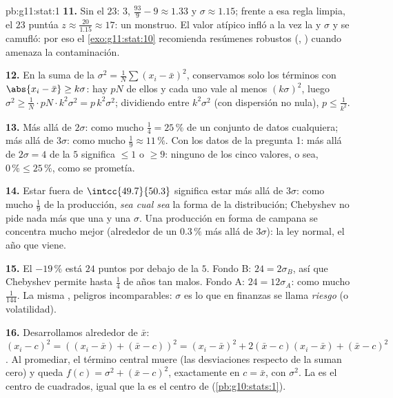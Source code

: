 \begin{solution}{pb:g11:stat:1}
\textbf{11.} Sin el $23$:  $3$, 
$\frac{93}{9} - 9 \approx 1.33$ y $\sigma \approx 1.15$; frente a esa
regla limpia, el $23$ puntúa $z \approx \frac{20}{1.15} \approx 17$: un
monstruo. El valor atípico infló a la vez la  y $\sigma$ y se
camufló: por eso el \cref{exo:g11:stat:10} recomienda resúmenes robustos
(, ) cuando amenaza la contaminación.

\textbf{12.} En la suma de la 
$\sigma^2 = \frac1N \sum (x_i - \bar x)^2$, conservamos solo los términos
con $\abs{x_i - \bar x} \geq k\sigma$: hay $pN$ de ellos y cada uno vale
al menos $(k\sigma)^2$, luego
$\sigma^2 \geq \frac{1}{N} \cdot pN \cdot k^2\sigma^2 =
p\,k^2\sigma^2$; dividiendo entre $k^2 \sigma^2$ (con dispersión no
nula), $p \leq \frac{1}{k^2}$.

\textbf{13.} Más allá de $2\sigma$: como mucho $\frac14 = 25\,\%$ de un
conjunto de datos cualquiera; más allá de $3\sigma$: como mucho
$\frac19 \approx 11\,\%$. Con los datos de la pregunta 1: más allá de
$2\sigma = 4$ de la  $5$ significa $\leq 1$ o $\geq 9$: ninguno de
los cinco valores, o sea, $0\,\% \leq 25\,\%$, como se prometía.

\textbf{14.} Estar fuera de $\intcc{49.7}{50.3}$ significa estar más allá
de $3\sigma$: como mucho $\frac19$ de la producción, \emph{sea cual sea}
la forma de la distribución; Chebyshev no pide nada más que una  y
una $\sigma$. Una producción en forma de campana se concentra mucho mejor
(alrededor de un $0.3\,\%$ más allá de $3\sigma$): la ley normal, el año
que viene.

\textbf{15.} El $-19\,\%$ está $24$ puntos por debajo de la  $5$.
Fondo B: $24 = 2\sigma_B$, así que Chebyshev permite hasta $\frac14$ de
años tan malos. Fondo A: $24 = 12\sigma_A$: como mucho $\frac{1}{144}$. La
misma , peligros incomparables: $\sigma$ es lo que en finanzas se
llama \emph{riesgo} (o volatilidad).

\textbf{16.} Desarrollamos alrededor de $\bar x$:
$(x_i - c)^2 = \left((x_i - \bar x) + (\bar x - c)\right)^2
= (x_i - \bar x)^2 + 2(\bar x - c)(x_i - \bar x) + (\bar x - c)^2$. Al
promediar, el término central muere (las desviaciones respecto de la 
suman cero) y queda $f(c) = \sigma^2 + (\bar x - c)^2$,  exactamente
en $c = \bar x$, con  $\sigma^2$. La  es el centro de 
cuadrados, igual que la  es el centro de  
(\cref{pb:g10:stats:1}).


\end{solution}
